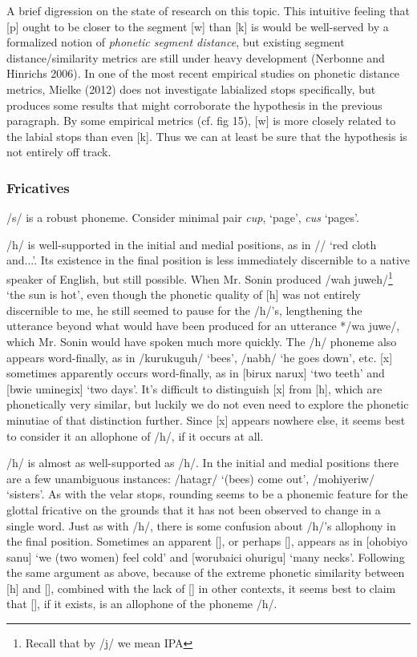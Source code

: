 \documentclass[pdftex,12pt,letterpaper]{article}
\let\ipa\textipa
\def\sw{\ipa{\super w}}
\begin{document}
 A brief digression on the state of research on this topic. This intuitive feeling that [p] ought to be closer to the segment [w] than [k] is would be well-served by a formalized notion of \emph{phonetic segment distance}, but existing segment distance/similarity metrics are still under heavy development (Nerbonne and Hinrichs 2006). In one of the most recent empirical studies on phonetic distance metrics, Mielke (2012) does not investigate labialized stops specifically, but produces some results that might corroborate the hypothesis in the previous paragraph. By some empirical metrics (cf. fig 15), [w] is more closely related to the labial stops than even [k\sw]. Thus we can at least be sure that the hypothesis is not entirely off track.

 \subsubsection{Fricatives}

 /s/ is a robust phoneme. Consider minimal pair \emph{cup}, `page', \emph{cus} `pages'. 

 /h/ is well-supported in the initial and medial positions, as in /\ipa{ah{\sw}i aropa hani}/ `red cloth and...'. Its existence in the final position is less immediately discernible to a native speaker of English, but still possible. When Mr. Sonin produced /wah juweh/\footnote{Recall that by /j/ we mean IPA \ipa{[\t{dZ}]}} `the sun is hot', even though the phonetic quality of [h] was not entirely discernible to me, he still seemed to pause for the /h/'s, lengthening the utterance beyond what would have been produced for an utterance */wa juwe/, which Mr. Sonin would have spoken much more quickly. The /h/ phoneme also appears word-finally, as in /kurukuguh/ `bees', /nab\ipa{1}h/ `he goes down', etc. [x] sometimes apparently occurs word-finally, as in [bi\ipa{@}rux narux] `two teeth' and [bwie \ipa{\textltailn}umineg\sw ix] `two days'. It's difficult to distinguish [x] from [h], which are phonetically very similar, but luckily we do not even need to explore the phonetic minutiae of that distinction further. Since [x] appears nowhere else, it seems best to consider it an allophone of /h/, if it occurs at all.
 
 /h\sw/ is almost as well-supported as /h/. In the initial and medial positions there are a few unambiguous instances: /h\sw atag\ipa{1}r/ `(bees) come out', /moh\sw iyeriw/ `sisters'. As with the velar stops, rounding seems to be a phonemic feature for the glottal fricative on the grounds that it has not been observed to change in a single word. Just as with /h/, there is some confusion about /h\sw/'s allophony in the final position. Sometimes an apparent [\ipa{F}], or perhaps [\ipa{\r*w}], appears as in [ohobiyo\ipa{F} \ipa{\textltailn uman@g@s} sanu\ipa{F}] `we (two women) feel cold' and [worubaici ohurigu\ipa{F}] `many necks'. Following the same argument as above, because of the extreme phonetic similarity between [h\sw] and [\ipa{F}], combined with the lack of [\ipa{F}] in other contexts, it seems best to claim that [\ipa{F}], if it exists, is an allophone of the phoneme /h\sw/. 
 
\end{document}
